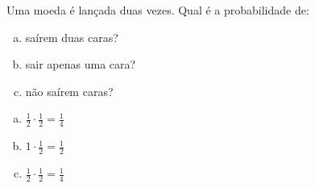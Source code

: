 \begin{ex}
Uma moeda é lançada duas vezes. Qual é a probabilidade de:
   \begin{enumerate}[(a)]
   \item saírem duas caras?
   \item sair apenas uma cara?
   \item não saírem caras?
   \end{enumerate}
    \begin{sol}
     \phantom{A}
      \begin{enumerate} [(a)]
          \item $\frac{1}{2}\cdot\frac{1}{2}=\frac{1}{4}$
          \item $1\cdot\frac{1}{2}=\frac{1}{2}$
          \item $\frac{1}{2}\cdot\frac{1}{2}=\frac{1}{4}$
      \end{enumerate}
    \end{sol}
\end{ex}